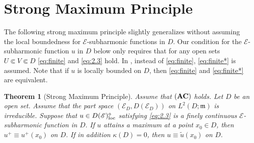 \documentclass[12pt,a4paper]{article}
\newtheorem{thm}{Theorem}[section]
\newcommand{\m}{\mathfrak{m} }
\newcommand{\loc}{{\rm loc}}
\newcommand{\1}{{\bf 1}}
\begin{document}
\section{Strong Maximum Principle}\label{sec:strongmaxprin}
The following strong maximum principle slightly generalizes \cite[Theorem~2.11]{CK} without assuming the local boundedness for $\mathscr{E}$-subharmonic functions in  $D$. 
Our condition for the $\mathscr{E}$-subharmonic function $u$ in $D$  below only requires that for any open sets $U\Subset V\Subset D$
\eqref{eq:finite} and \eqref{eq:2.3} hold. 
In \cite[Theorem~2.11]{CK}, instead of \eqref{eq:finite}, 
\eqref{eq:finite*} 
is assumed. 
Note that if $u$ is locally bounded on $D$, then \eqref{eq:finite} and \eqref{eq:finite*} are equivalent.  
\begin{thm}[{Strong Maximum Principle}]\label{thm:strongMax}
Assume that ${\bf (AC)}$ holds. 
Let $D$ be an open set. Assume that the part space $(\mathscr{E}_D,D(\mathscr{E}_D))$ on $L^2(D;\m)$ is irreducible.   
Suppose that $u\in D(\mathscr{E})_{\loc}^{\diamond}$ satisfying \eqref{eq:2.3} is a finely continuous $\mathscr{E}$-subharmonic function in $D$. 
If $u$ attains a maximum at a point $x_0\in D$, then $u^+\equiv u^+(x_0)$ on $D$. If in addition $\kappa(D)=0$, then $u\equiv \tilde{u}(x_0)$ on $D$.
\end{thm}
\end{document}
